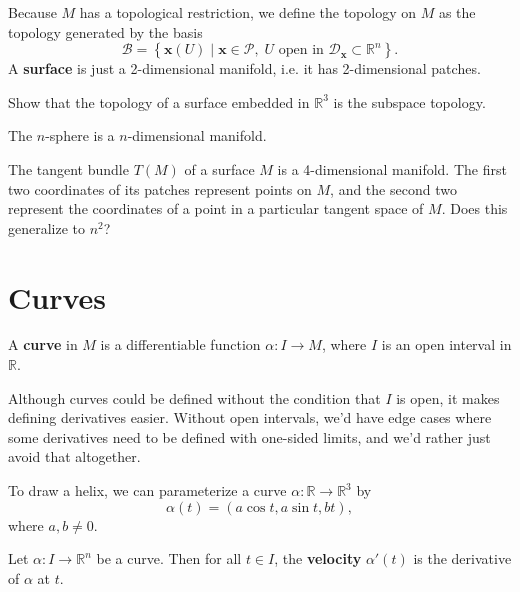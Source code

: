 \documentclass[twoside,10pt]{report}
\begin{document}
Because $M$ has a topological restriction, we define the topology on $M$ as the topology generated by the basis
\[
	\mathcal{B} = \left\{ \mathbf{x}(U) \;|\; \mathbf{x} \in \mathcal{P},\; U \text{ open in } \mathcal{D}_{\mathbf{x}} \subset \mathbb{R}^n \right\}.
\] 
A \textbf{surface} is just a 2-dimensional manifold, i.e. it has 2-dimensional patches.

{\color{red}Show that the topology of a surface embedded in $\mathbb{R}^3$ is the subspace topology.}

\begin{ex}[]
The $n$-sphere is a $n$-dimensional manifold.
\end{ex}

\begin{ex}[]
	The tangent bundle $T(M)$ of a surface $M$ is a 4-dimensional manifold. The first two coordinates of its patches represent points on $M$, and the second two represent the coordinates of a point in a particular tangent space of $M$. {\color{red}Does this generalize to $n^2$?}
\end{ex}


\section{Curves}

\begin{defn}
A \textbf{curve} in $M$ is a differentiable function $\alpha:I\to M$, where $I$ is an open interval in $\mathbb{R}$.
\end{defn}

Although curves could be defined without the condition that $I$ is open, it makes defining derivatives easier. Without open intervals, we'd have edge cases where some derivatives need to be defined with one-sided limits, and we'd rather just avoid that altogether.

\begin{ex}
	To draw a helix, we can parameterize a curve $\alpha:\mathbb{R}\to \mathbb{R}^3$ by 
	\[
		\alpha(t)=(a \cos t, a \sin t, bt),
	\] where $a, b\neq 0$.
\end{ex}

\begin{defn}
	Let $\alpha:I\to \mathbb{R}^n$ be a curve. Then for all $t \in I$, the \textbf{velocity} $\alpha'(t)$ is the derivative of $\alpha$ at $t$.
\end{defn}
\end{document}
